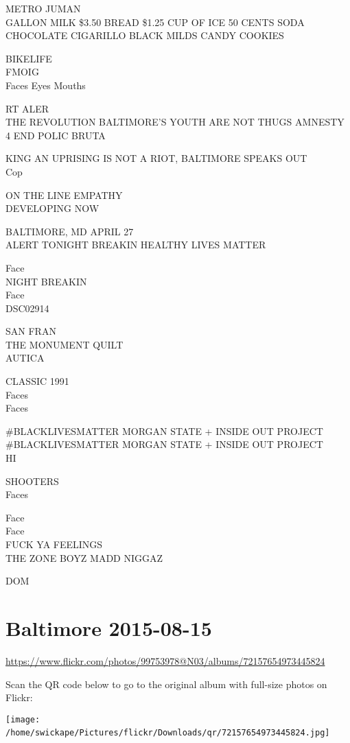 \documentclass[10pt,letterpaper]{article}
\begin{document}
METRO JUMAN\\
GALLON MILK \$3.50 BREAD \$1.25 CUP OF ICE 50 CENTS SODA CHOCOLATE CIGARILLO BLACK MILDS CANDY COOKIES

BIKELIFE\\
FMOIG\\
Faces Eyes Mouths

RT ALER\\
THE REVOLUTION BALTIMORE'S YOUTH ARE NOT THUGS AMNESTY 4 END POLIC BRUTA

KING AN UPRISING IS NOT A RIOT, BALTIMORE SPEAKS OUT\\
Cop

ON THE LINE EMPATHY\\
DEVELOPING NOW

BALTIMORE, MD APRIL 27\\
ALERT TONIGHT BREAKIN HEALTHY LIVES MATTER

Face\\
NIGHT BREAKIN\\
Face\\
DSC02914

SAN FRAN\\
THE MONUMENT QUILT\\
AUTICA

CLASSIC 1991\\
Faces\\
Faces

\#BLACKLIVESMATTER MORGAN STATE + INSIDE OUT PROJECT\\
\#BLACKLIVESMATTER MORGAN STATE + INSIDE OUT PROJECT\\
HI

SHOOTERS\\
Faces

Face\\
Face\\
FUCK YA FEELINGS\\
THE ZONE BOYZ MADD NIGGAZ

DOM
\

\section*{Baltimore 2015-08-15}

\url{https://www.flickr.com/photos/99753978@N03/albums/72157654973445824}

Scan the QR code below to go to the original album with full-size photos on Flickr:

\texttt{[image: /home/swickape/Pictures/flickr/Downloads/qr/72157654973445824.jpg]}
\
\end{document}
